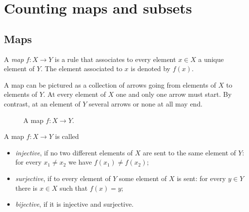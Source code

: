 \section{Counting maps and subsets}
\subsection{Maps}
A \emph{map} $f \colon X \to Y$ is a rule that associates to every element $x \in X$ a unique element of $Y$.
The element associated to $x$ is denoted by $f(x)$.

A map can be pictured as a collection of arrows going from elements of $X$ to elements of $Y$.
At every element of $X$ one and only one arrow must start.
By contrast, at an element of $Y$ several arrows or none at all may end.

\begin{figure}[ht]
\begin{center}

\end{center}
\caption{A map $f \colon X \to Y$.}
\label{fig:Map}
\end{figure}

A map $f \colon X \to Y$ is called
\begin{itemize}
\item
\emph{injective}, if no two different elements of $X$ are sent to the same element of $Y$: for every $x_1 \ne x_2$ we have $f(x_1) \ne f(x_2)$;
\item
\emph{surjective}, if to every element of $Y$ some element of $X$ is sent: for every $y \in Y$ there is $x \in X$ such that $f(x) = y$;
\item
\emph{bijective}, if it is injective and surjective.
\end{itemize}
